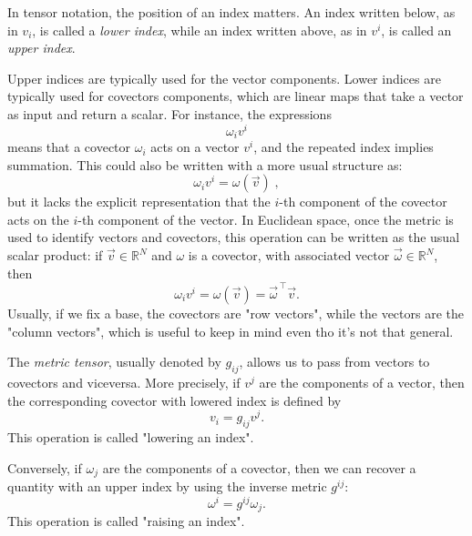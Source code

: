 \documentclass[12pt,a4paper]{article}
\begin{document}
In tensor notation, the position of an index matters. An index written below, as in $v_i$, is called a \textit{lower index}, while an index written above, as in $v^i$, is called an \textit{upper index}.

Upper indices are typically used for the vector components. Lower indices are typically used for covectors components, which are linear maps that take a vector as input and return a scalar. For instance, the expressions
\begin{equation*}
	\omega_i v^i
\end{equation*}
means that a covector $\omega_i$ acts on a vector $v^i$, and the repeated index implies summation. This could also be written with a more usual structure as:
\begin{equation*}
	\omega_i v^i = \omega(\vec{v}) \;,
\end{equation*}
but it lacks the explicit representation that the $i$-th component of the covector acts on the $i$-th component of the vector.
In Euclidean space, once the metric is used to identify vectors and covectors, this operation can be written as the usual scalar product: if $\vec{v}\in\mathbb{R}^N$ and $\omega$ is a covector, with associated vector $\vec{\omega}\in\mathbb{R}^N$, then
\begin{equation*}
	\omega_i v^i = \omega(\vec{v}) = \vec{\omega}^{\,\top}\vec{v}.
\end{equation*}
Usually, if we fix a base, the covectors are "row vectors", while the vectors are the "column vectors", which is useful to keep in mind even tho it's not that general.

The \textit{metric tensor}, usually denoted by $g_{ij}$, allows us to pass from vectors to covectors and viceversa. More precisely, if $v^j$ are the components of a vector, then the corresponding covector with lowered index is defined by
\begin{equation*}
	v_i = g_{ij}v^j.
\end{equation*}
This operation is called "lowering an index".

Conversely, if $\omega_j$ are the components of a covector, then we can recover a quantity with an upper index by using the inverse metric $g^{ij}$:
\begin{equation*}
	\omega^i = g^{ij}\omega_j.
\end{equation*}
This operation is called "raising an index".
\end{document}
